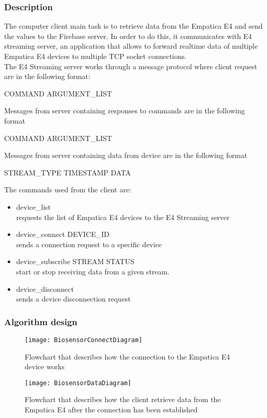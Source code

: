 \subsubsection{Description}
The computer client main task is to retrieve data from the Empatica E4 and send the values to the Firebase server. In order to do this, it communicates with E4 streaming server, an application that allows to forward realtime data of multiple Empatica E4 devices to multiple TCP socket connections.\\
The E4 Streaming server works through a message protocol where client request are in the following format:
\begin{center}
	COMMAND ARGUMENT\_LIST
\end{center}
Messages from server containing responses to commands are in the following format
\begin{center}
	COMMAND ARGUMENT\_LIST
\end{center}
Messages from server containing data from device are in the following format
\begin{center}
	STREAM\_TYPE TIMESTAMP DATA
\end{center}
The commands used from the client are:
\begin{itemize}
	\item device\_list\\
	requests the list of Empatica E4 devices to the E4 Streaming server
	\item device\_connect DEVICE\_ID\\
	sends a connection request to a specific device
	\item device\_subscribe STREAM STATUS\\
	start or stop receiving data from a given stream.
	\item device\_disconnect\\
	sends a device disconnection request
\end{itemize}
\pagebreak
\subsubsection{Algorithm design}
\begin{figure}[H]
	\centering
	\texttt{[image: BiosensorConnectDiagram]}
	\caption{Flowchart that describes how the connection to the Empatica E4 device works}
\end{figure}

\begin{figure}[H]
	\centering
	\texttt{[image: BiosensorDataDiagram]}
	\caption{Flowchart that describes how the client retrieve data from the Empatica E4 after the connection has been established}
\end{figure}
\pagebreak

